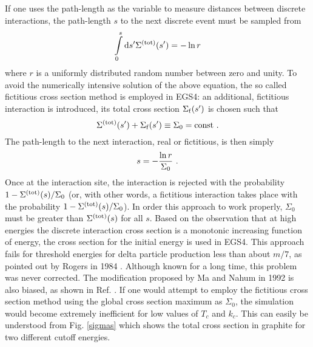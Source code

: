 If one uses the path-length as the variable to measure
distances between discrete interactions, the path-length
$s$ to the next discrete event must be sampled from
\begin{equation}
\int\limits_0^s {\rm d} s' \Sigma^{\rm (tot)}(s') = -\ln r
\end{equation}
where $r$ is a uniformly distributed random number between
zero and unity. To avoid the numerically intensive
solution of the above equation, the so called
fictitious cross section method is employed in EGS4: an additional,
fictitious interaction is introduced, its total cross section
$\Sigma_{\rm f}(s')$ is chosen such that
\begin{equation}
\Sigma^{\rm (tot)}(s') + \Sigma_{\rm f}(s') \equiv \Sigma_0 = \text{const}~.
\end{equation}
The path-length to the next interaction, real or fictitious, is then
simply
\begin{equation}
s = -{ \ln r \over \Sigma_0 }~.
\end{equation}
Once at the interaction site, the interaction is rejected with the
probability $1 - \Sigma^{\rm (tot)}(s)/\Sigma_0$ (or, with other words,
a fictitious interaction takes place with the probability
$1 - \Sigma^{\rm (tot)}(s)/\Sigma_0$). In order this approach to work
properly, $\Sigma_0$ must be greater than $\Sigma^{\rm (tot)}(s)$ for
all $s$. Based on the observation that at high energies the
discrete interaction cross section is a monotonic increasing function
of energy, the cross section for the initial energy is used in EGS4.
This approach fails for threshold energies for delta particle
production less than about $m/7$, as pointed out by Rogers
in 1984 \cite{Ro84}. Although known for a long time, this problem
was never corrected. The modification proposed by Ma and Nahum
in 1992 \cite{MN92} is also biased, as shown in Ref. \cite{Ka99a}.
If one would attempt to employ the fictitious cross section method
using the global cross section maximum as $\Sigma_0$, the
simulation would become extremely inefficient for low values
of $T_c$ and $k_c$. This can easily be understood from
Fig. \ref{sigmas} which shows the total cross section in graphite
for two different cutoff energies.

